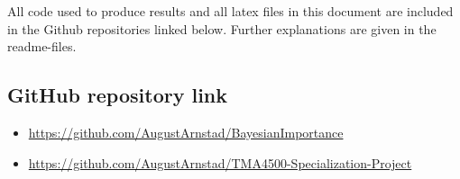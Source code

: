 

All code used to produce results and all latex files in this document are included in the Github repositories linked below. Further explanations are given in the readme-files. 
\subsection*{GitHub repository link}
\begin{itemize}
    \item \url{https://github.com/AugustArnstad/BayesianImportance}
    \item \url{https://github.com/AugustArnstad/TMA4500-Specialization-Project}
\end{itemize}

